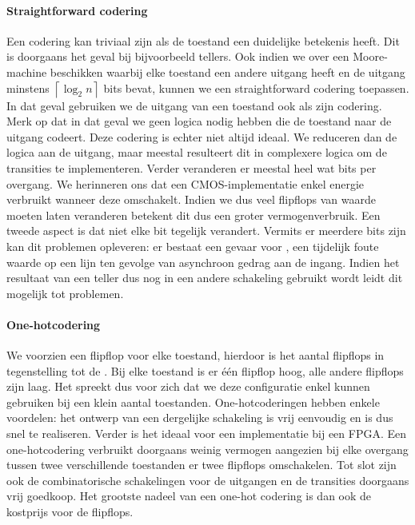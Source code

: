 \paragraph{Straightforward codering}Een codering kan triviaal zijn als de toestand een duidelijke betekenis heeft. Dit is doorgaans het geval bij bijvoorbeeld tellers. Ook indien we over een Moore-machine beschikken waarbij elke toestand een andere uitgang heeft en de uitgang minstens $\left\lceil\log_2 n\right\rceil$ bits bevat, kunnen we een straightforward codering toepassen. In dat geval gebruiken we de uitgang van een toestand ook als zijn codering. Merk op dat in dat geval we geen logica nodig hebben die de toestand naar de uitgang codeert. Deze codering is echter niet altijd ideaal. We reduceren dan de logica aan de uitgang, maar meestal resulteert dit in complexere logica om de transities te implementeren. Verder veranderen er meestal heel wat bits per overgang. We herinneren ons dat een CMOS-implementatie enkel energie verbruikt wanneer deze omschakelt. Indien we dus veel flipflops van waarde moeten laten veranderen betekent dit dus een groter vermogenverbruik. Een tweede aspect is dat niet elke bit tegelijk verandert. Vermits er meerdere bits zijn kan dit problemen opleveren: er bestaat een gevaar voor , een tijdelijk foute waarde op een lijn ten gevolge van asynchroon gedrag aan de ingang. Indien het resultaat van een teller dus nog in een andere schakeling gebruikt wordt leidt dit mogelijk tot problemen.
\paragraph{One-hotcodering}We voorzien een flipflop voor elke toestand, hierdoor is het aantal flipflops  in tegenstelling tot de . Bij elke toestand is er \'e\'en flipflop hoog, alle andere flipflops zijn laag. Het spreekt dus voor zich dat we deze configuratie enkel kunnen gebruiken bij een klein aantal toestanden. One-hotcoderingen hebben enkele voordelen: het ontwerp van een dergelijke schakeling is vrij eenvoudig en is dus snel te realiseren. Verder is het ideaal voor een implementatie bij een FPGA. Een one-hotcodering verbruikt doorgaans weinig vermogen aangezien bij elke overgang tussen twee verschillende toestanden er twee flipflops omschakelen. Tot slot zijn ook de combinatorische schakelingen voor de uitgangen en de transities doorgaans vrij goedkoop. Het grootste nadeel van een one-hot codering is dan ook de kostprijs voor de flipflops.
